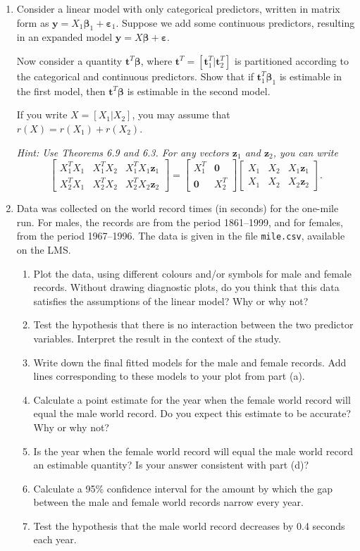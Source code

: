 \documentclass[a4paper]{article}
\newcommand{\bemat}{\left[\begin{array}}
\newcommand{\enmat}{\end{array}\right]}
\newcommand{\B}{\boldsymbol\beta}
\newcommand{\E}{\boldsymbol\varepsilon}
\newcommand{\tb}{\mathbf{t}}
\newcommand{\y}{\mathbf{y}}
\newcommand{\z}{\mathbf{z}}
\newcommand{\0}{\mathbf{0}}
\begin{document}
\begin{enumerate}
\item Consider a linear model with only categorical predictors, written in matrix form as $\y = X_1 \B_1 + \E_1$. Suppose we add some continuous predictors, resulting in an expanded model $\y = X \B + \E$. 
	
	Now consider a quantity $\tb^T\B$, where $\tb^T = [\tb_1^T|\tb_2^T]$ is partitioned according to the categorical and continuous predictors. Show that if $\tb_1^T\B_1$ is estimable in the first model, then $\tb^T\B$ is estimable in the second model.

	If you write $X = [X_1 | X_2]$, you may assume that $r(X) = r(X_1) + r(X_2)$.

	\vspace{0.2cm}

	\emph{Hint: Use Theorems 6.9 and 6.3. For any vectors $\z_1$ and $\z_2$, you can write \[\bemat{cc|c} X_1^T X_1 & X_1^T X_2 & X_1^T X_1 \z_1 \\ X_2^T X_1 & X_2^T X_2 & X_2^T X_2 \z_2 \enmat = \bemat{cc} X_1^T & \0 \\ \0 & X_2^T\enmat\bemat{cc|c} X_1 & X_2 & X_1 \z_1 \\ X_1 & X_2 & X_2 \z_2 \enmat.\]}



\item Data was collected on the world record times (in seconds) for the one-mile run. For males, the records are from the period 1861--1999, and for females, from the period 1967--1996. The data is given in the file \texttt{mile.csv}, available on the LMS.

\begin{enumerate}
	\item Plot the data, using different colours and/or symbols for male and female records. Without drawing diagnostic plots, do you think that this data satisfies the assumptions of the linear model? Why or why not?
	\item Test the hypothesis that there is no interaction between the two predictor variables. Interpret the result in the context of the study.
	\item Write down the final fitted models for the male and female records. Add lines corresponding to these models to your plot from part (a).
	\item Calculate a point estimate for the year when the female world record will equal the male world record. Do you expect this estimate to be accurate? Why or why not?
	\item Is the year when the female world record will equal the male world record an estimable quantity? Is your answer consistent with part (d)?
	\item Calculate a 95\% confidence interval for the amount by which the gap between the male and female world records narrow every year.
	\item Test the hypothesis that the male world record decreases by 0.4 seconds each year. 
\end{enumerate}



\end{enumerate}
\end{document}
